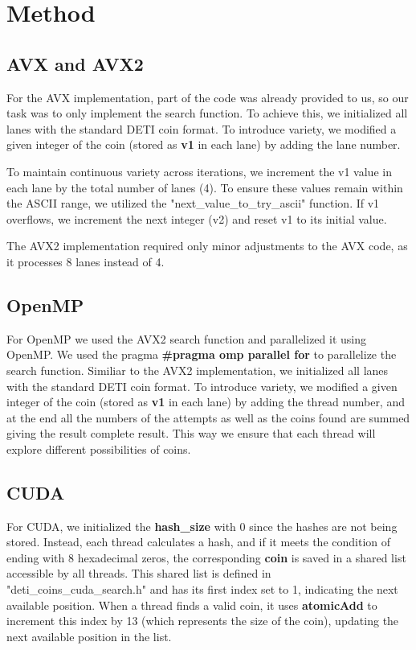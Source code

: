\documentclass[a4paper,12pt]{article}
\begin{document}
\section{Method}
\label{sec:method}
\subsection{AVX and AVX2}
\label{subsec:avx}

For the AVX implementation, part of the code was already provided to us, so our task was to only implement the search function. To achieve this, we initialized all lanes with the standard DETI coin format. To introduce variety, we modified a given integer of the coin (stored as \textbf{v1} in each lane) by adding the lane number.

To maintain continuous variety across iterations, we increment the v1 value in each lane by the total number of lanes (4). To ensure these values remain within the ASCII range, we utilized the "next\_value\_to\_try\_ascii" function. If v1 overflows, we increment the next integer (v2) and reset v1 to its initial value.

The AVX2 implementation required only minor adjustments to the AVX code, as it processes 8 lanes instead of 4.


\subsection{OpenMP}
\label{subsec:openmp}

For OpenMP we used the AVX2 search function and parallelized it using OpenMP.
We used the pragma \textbf{\#pragma omp parallel for} to parallelize the 
search function.
Similiar to the AVX2 implementation, we initialized all lanes with the standard
DETI coin format. To introduce variety, we modified a given integer of the coin
(stored as \textbf{v1} in each lane) by adding the thread number,
 and at the end all the numbers of the attempts as well as the coins found are summed giving the result complete result.
This way we ensure that each thread will explore different possibilities of coins.

\subsection{CUDA}
\label{subsec:cuda}

For CUDA, we initialized the \textbf{hash\_size} with 0 since the hashes are not being stored. Instead, each thread calculates a hash, and if it meets the condition of ending with 8 hexadecimal zeros, the corresponding \textbf{coin} is saved in a shared list accessible by all threads. This shared list is defined in "deti\_coins\_cuda\_search.h" and has its first index set to 1, indicating the next available position. When a thread finds a valid coin, it uses \textbf{atomicAdd} to increment this index by 13 (which represents the size of the coin), updating the next available position in the list.
\end{document}

